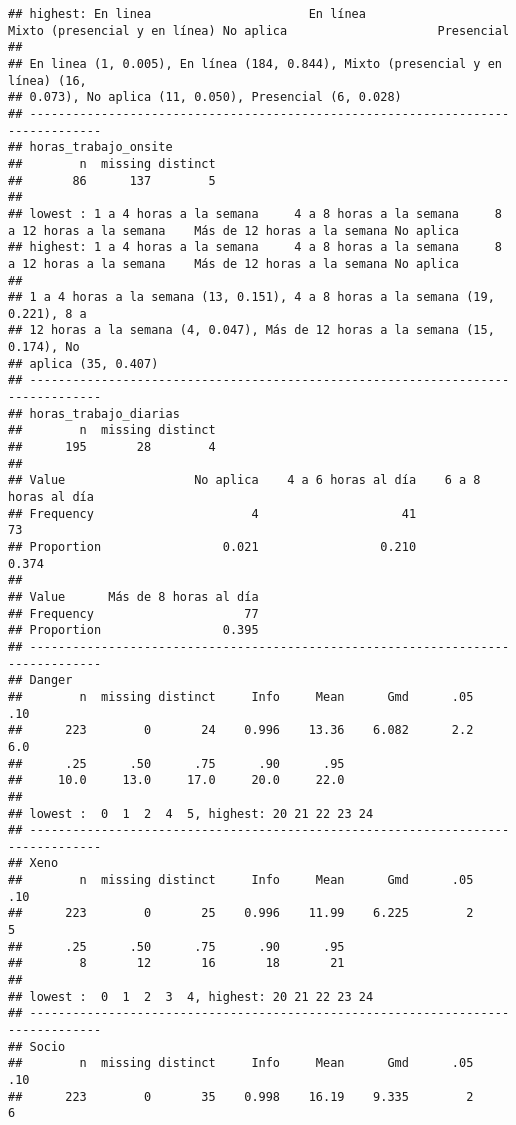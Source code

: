 \documentclass[
]{book}
\begin{document}
\begin{verbatim}
## highest: En linea                      En línea                      Mixto (presencial y en línea) No aplica                     Presencial                   
## 
## En linea (1, 0.005), En línea (184, 0.844), Mixto (presencial y en línea) (16,
## 0.073), No aplica (11, 0.050), Presencial (6, 0.028)
## --------------------------------------------------------------------------------
## horas_trabajo_onsite 
##        n  missing distinct 
##       86      137        5 
## 
## lowest : 1 a 4 horas a la semana     4 a 8 horas a la semana     8 a 12 horas a la semana    Más de 12 horas a la semana No aplica                  
## highest: 1 a 4 horas a la semana     4 a 8 horas a la semana     8 a 12 horas a la semana    Más de 12 horas a la semana No aplica                  
## 
## 1 a 4 horas a la semana (13, 0.151), 4 a 8 horas a la semana (19, 0.221), 8 a
## 12 horas a la semana (4, 0.047), Más de 12 horas a la semana (15, 0.174), No
## aplica (35, 0.407)
## --------------------------------------------------------------------------------
## horas_trabajo_diarias 
##        n  missing distinct 
##      195       28        4 
##                                                                             
## Value                  No aplica    4 a 6 horas al día    6 a 8 horas al día
## Frequency                      4                    41                    73
## Proportion                 0.021                 0.210                 0.374
##                                 
## Value      Más de 8 horas al día
## Frequency                     77
## Proportion                 0.395
## --------------------------------------------------------------------------------
## Danger 
##        n  missing distinct     Info     Mean      Gmd      .05      .10 
##      223        0       24    0.996    13.36    6.082      2.2      6.0 
##      .25      .50      .75      .90      .95 
##     10.0     13.0     17.0     20.0     22.0 
## 
## lowest :  0  1  2  4  5, highest: 20 21 22 23 24
## --------------------------------------------------------------------------------
## Xeno 
##        n  missing distinct     Info     Mean      Gmd      .05      .10 
##      223        0       25    0.996    11.99    6.225        2        5 
##      .25      .50      .75      .90      .95 
##        8       12       16       18       21 
## 
## lowest :  0  1  2  3  4, highest: 20 21 22 23 24
## --------------------------------------------------------------------------------
## Socio 
##        n  missing distinct     Info     Mean      Gmd      .05      .10 
##      223        0       35    0.998    16.19    9.335        2        6 

\end{verbatim}
\end{document}
